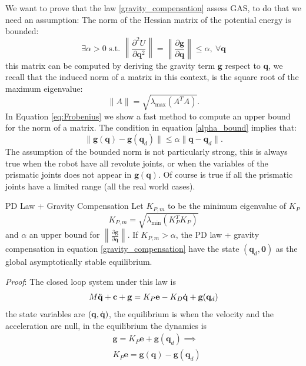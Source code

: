 \documentclass[10pt, a4paper]{report}
\newcommand{\q}{{\mathbf q}}
\begin{document}
We want to prove that the law \eqref{gravity_compensation} assess GAS, to do that we need an assumption: The norm of the Hessian matrix of the potential energy is bounded:\begin{equation}\label{alpha_bound}
    \exists\alpha >0 \text{ s.t. }\left\|\frac{\partial^2 U}{\partial \q^2}\right\|=
   \left\|\frac{\partial\mathbf g}{\partial \q}\right\|\le \alpha, \ \forall \q
\end{equation}
this matrix can be computed by deriving the gravity term $\mathbf g$ respect to $\q$, we recall that the induced norm of a matrix in this context, is the square root of the maximum eigenvalue:\begin{equation}
    \|A\|=\sqrt{\lambda_{\text{max}}(A^TA)}.
\end{equation}
In Equation \eqref{eq:Frobenius} we show a fast method to compute an upper bound for the norm of a matrix.
The condition in equation \eqref{alpha_bound} implies that:\begin{equation}\label{alpha_bound2}
    \|\mathbf g(\q)-\mathbf g(\q_d)\|\le\alpha\|\q-\q_d\|.
\end{equation} 
The assumption of the bounded norm is not particularly strong, this is always true when the robot have all revolute joints, or when the variables of the prismatic joints does not appear in $\mathbf g(\q)$. Of course is true if all the prismatic joints have a limited range (all the real world cases).
\begin{boxtheorem}{PD Law + Gravity Compensation}{}
    Let $K_{P,m}$ to be the minimum eigenvalue of $K_P$
    $$ K_{P,m}=\sqrt{\lambda_{\text{min}}(K_P^TK_P)}
    $$
    and $\alpha$ an upper bound for $\displaystyle\left\|\frac{\partial\mathbf g}{\partial \q}\right\|$. If $K_{P,m}>\alpha$, the PD law + gravity compensation in equation \eqref{gravity_compensation} have the state $(\q_d,\mathbf 0)$ as the global asymptotically stable equilibrium.
\end{boxtheorem}
\noindent\textit{Proof}: The closed loop system under this law is\begin{equation}
    M\ddq+\mathbf c+\mathbf g=K_P\mathbf e-K_D\dq+\mathbf g(\q_d)
\end{equation}
the state variables are $(\q,\dq)$, the equilibrium is when the velocity and the acceleration are null, in the equilibrium the dynamics is\begin{align}
   &\mathbf g=K_P\mathbf e+\mathbf g(\q_d)\implies\\ 
   &K_P\mathbf e=\mathbf g(\q)-\mathbf g(\q_d)\label{equilibrium_grav_comp}
\end{align}
\end{document}
